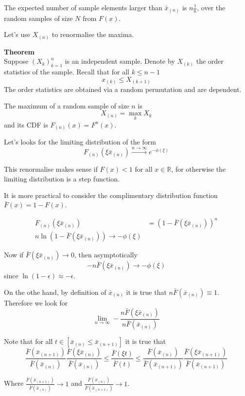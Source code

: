 \documentclass[a4paper]{article}
\newcommand{\clo}[1]{{\left [ #1 \right ]}}
\newcommand{\brac}[1]{{\left ( #1 \right )}}
\newcommand{\Real}{\mathbb{R}}
\begin{document}
The expected number of sample elements larger than $\bar{x}_{(n)}$ is $n\frac{1}{n}$, over the random samples of size $N$ from $F(x)$.

Let's use $X_{(n)}$ to renormalise the maxima.

\noindent\textbf{Theorem}\hfill\\
Suppose $\brac{X_k}_{k=1}^n$ is an independent sample. Denote by $X_{(k)}$ the order statistics of the sample. Recall that for all $k\leq n-1$
\[x_{(k)}\leq X_{(k+1)}\]
The order statistics are obtained via a random permutation and are dependent.

The maximum of a random sample of size $n$ is \[X_{(n)} = \max_k X_k\] and its CDF is $F_{(n)}(x) = F^n(x)$.

Let's looks for the limiting distribution of the form 
\[F_{(n)}(\xi \bar{x}_{(n)}) \overset{n\to \infty}{\to} e^{-\phi(\xi)} \]

This renormalise makes sense if $F(x)<1$ for all $x\in \Real$, for otherwise the limiting distribution is a step function.

It is more practical to consider the complimentary distribution function $\bar{F}(x) = 1-F(x)$.

\begin{align*}
	F_{(n)}(\xi \bar{x}_{(n)}) &= \brac{1-\bar{F}(\xi \bar{x}_{(n)})}^n\\
	n \ln\brac{1-\bar{F}(\xi \bar{x}_{(n)})} \to -\phi(\xi)
\end{align*}

Now if $\bar{F}(\xi \bar{x}_{(n)})\to 0$, then asymptotically 
\[- n \bar{F}(\xi \bar{x}_{(n)}) \to -\phi(\xi)\]
since $\ln (1-\epsilon)\approx -\epsilon$.

On the othe hand, by definition of $\bar{x}_{(n)}$ it is true that $
n\bar{F}(\bar{x}_{(n)}) \equiv 1$. Therefore we look for
\[\lim_{n\to \infty} - \frac{n \bar{F}(\xi \bar{x}_{(n)})}{ n\bar{F}(\bar{x}_{(n)}) }\]

Note that for all $t\in \clo{ \bar{x}_{(n)}\leq \bar{x}_{(n+1)}}$ it is true that 
\[
\frac{\bar{F}(\bar{x}_{(n+1)})}{ \bar{F}(\bar{x}_{(n)}) } \frac{\bar{F}(\xi \bar{x}_{(n)})}{ \bar{F}(\bar{x}_{(n)}) } \leq
\frac{\bar{F}(\xi t)}{ \bar{F}(t) } \leq
\frac{\bar{F}(\bar{x}_{(n)})}{ \bar{F}(\bar{x}_{(n+1)}) }
\frac{\bar{F}(\xi \bar{x}_{(n+1)})}{ \bar{F}(\bar{x}_{(n+1)}) }
\]

Where $\frac{\bar{F}(\bar{x}_{(n+1)})}{ \bar{F}(\bar{x}_{(n)}) }\to 1$ and $\frac{\bar{F}(\bar{x}_{(n)})}{ \bar{F}(\bar{x}_{(n+1)}) }\to 1$.
\end{document}
